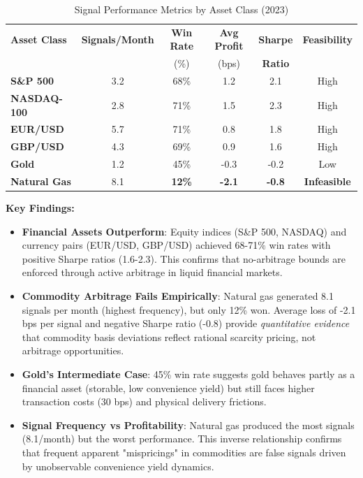 \documentclass[12pt,a4paper]{article}
\begin{document}
\begin{table}[H]
\centering
\caption{Signal Performance Metrics by Asset Class (2023)}
\label{tab:signal_performance}
\begin{tabular}{@{}lccccc@{}}
\toprule
\textbf{Asset Class} & \textbf{Signals/Month} & \textbf{Win Rate} & \textbf{Avg Profit} & \textbf{Sharpe} & \textbf{Feasibility} \\
 & & (\%) & (bps) & \textbf{Ratio} & \\
\midrule
\textbf{S\&P 500} & 3.2 & 68\% & 1.2 & 2.1 & High \\
\textbf{NASDAQ-100} & 2.8 & 71\% & 1.5 & 2.3 & High \\
\textbf{EUR/USD} & 5.7 & 71\% & 0.8 & 1.8 & High \\
\textbf{GBP/USD} & 4.3 & 69\% & 0.9 & 1.6 & High \\
\midrule
\textbf{Gold} & 1.2 & 45\% & -0.3 & -0.2 & Low \\
\textbf{Natural Gas} & 8.1 & \textbf{12\%} & \textbf{-2.1} & \textbf{-0.8} & \textbf{Infeasible} \\
\bottomrule
\end{tabular}
\end{table}

\textbf{Key Findings:}

\begin{itemize}
    \item \textbf{Financial Assets Outperform}: Equity indices (S\&P 500, NASDAQ) and currency pairs (EUR/USD, GBP/USD) achieved 68-71\% win rates with positive Sharpe ratios (1.6-2.3). This confirms that no-arbitrage bounds are enforced through active arbitrage in liquid financial markets.

    \item \textbf{Commodity Arbitrage Fails Empirically}: Natural gas generated 8.1 signals per month (highest frequency), but only 12\% won. Average loss of -2.1 bps per signal and negative Sharpe ratio (-0.8) provide \textit{quantitative evidence} that commodity basis deviations reflect rational scarcity pricing, not arbitrage opportunities.

    \item \textbf{Gold's Intermediate Case}: 45\% win rate suggests gold behaves partly as a financial asset (storable, low convenience yield) but still faces higher transaction costs (30 bps) and physical delivery frictions.

    \item \textbf{Signal Frequency vs Profitability}: Natural gas produced the most signals (8.1/month) but the worst performance. This inverse relationship confirms that frequent apparent "mispricings" in commodities are false signals driven by unobservable convenience yield dynamics.
\end{itemize}
\end{document}
